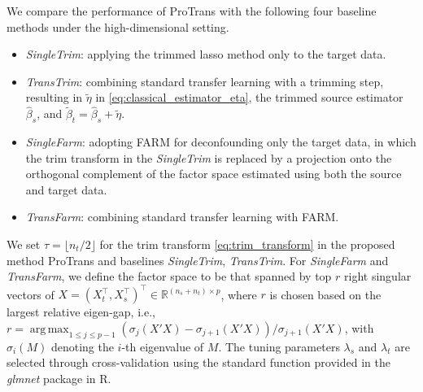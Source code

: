 \documentclass[12pt]{article}
\DeclareMathOperator*{\argmax}{arg\,max}
\begin{document}
We compare the performance of ProTrans with the following four baseline methods under the high-dimensional setting. 
\begin{itemize}
\item [(1)] \textit{SingleTrim}: applying the trimmed lasso method \citep{cevid2020spectral} only to the target data.
\item [(2)] \textit{TransTrim}: combining standard transfer learning \citep{li2022transfer} with a trimming step, resulting in $\tilde{\eta}$ in \eqref{eq:classical_estimator_eta}, the trimmed source estimator $\hat{\beta}_s$, and $\tilde{\beta}_t=\hat{\beta}_s+\tilde{\eta}$.
\item [(3)] \textit{SingleFarm}: adopting FARM \citep{fan2021robust} for deconfounding only the target data, in which the trim transform in the \textit{SingleTrim} is replaced by a projection onto the orthogonal complement of the factor space estimated using both the source and target data.
\item [(4)] \textit{TransFarm}: combining standard transfer learning with FARM.
\end{itemize}

We set $\tau = \lfloor n_t/2\rfloor$ for the trim transform \eqref{eq:trim_transform} in the proposed method ProTrans and baselines {\it SingleTrim}, {\it TransTrim}. For {\it SingleFarm} and {\it TransFarm}, we define the factor space to be that spanned by top $r$ right singular vectors of $X = (X_t^\top,X_s^\top)^\top \in \mathbb{R}^{(n_s+n_t)\times p}$, where $r$ is chosen based on the largest relative eigen-gap, i.e., $r = \argmax_{1\le j\le p-1} (\sigma_j(X'X) - \sigma_{j+1}(X'X))/\sigma_{j+1}(X'X)$, with $\sigma_i(M)$ denoting the $i$-th eigenvalue of $M$. The tuning parameters $\lambda_s$ and $\lambda_t$ are selected through cross-validation using the standard function provided in the \textit{glmnet} package in R.
\end{document}
